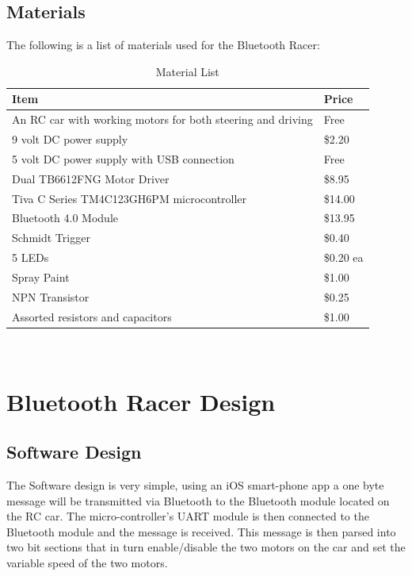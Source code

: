 \documentclass[12pt]{article}
\begin{document}
\subsection{Materials}
The following is a list of materials used for the Bluetooth Racer:
\begin{table}[H]
\centering
\caption{Material List}
\begin{tabular}{ll}\\
\hline
Item                                                        & Price     \\ \hline
An RC car with working motors for both steering and driving & Free      \\ \hline
9 volt DC power supply                                      & \$2.20    \\ \hline
5 volt DC power supply with USB connection                  & Free      \\ \hline
Dual TB6612FNG Motor Driver                                 & \$8.95    \\ \hline
Tiva C Series TM4C123GH6PM microcontroller                  & \$14.00   \\ \hline
Bluetooth 4.0 Module                                        & \$13.95   \\ \hline
Schmidt Trigger                                             & \$0.40    \\ \hline
5 LEDs                                                      & \$0.20 ea \\ \hline
Spray Paint                                                 & \$1.00    \\ \hline
NPN Transistor                                              & \$0.25    \\ \hline
Assorted resistors and capacitors                           & \$1.00    \\ \hline
\end{tabular}\\
\end{table}

\section{Bluetooth Racer Design}

\subsection{Software Design}
The Software design is very simple, using an iOS smart-phone app a one byte message will be transmitted via Bluetooth to the Bluetooth module located on the RC car. The micro-controller's UART module is then connected to the Bluetooth module and the message is received. This message is then parsed into two bit sections that in turn enable/disable the two motors on the car and set the variable speed of the two motors. \\
\end{document}

